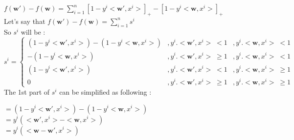 \documentclass[a4paper,11pt]{article}
\begin{document}
\begin{mlsolution}
\begin{math}
f\left ( \textbf{w}{}' \right ) - f\left ( \textbf{w} \right ) = \sum_{i=1}^{n} \left [  1 - y^{i}<\textbf{w}{}', x^{i}> \right ]_{+} - \left [  1 - y^{i}<\textbf{w}, x^{i}> \right ]_{+}
\end{math}\\

Let's say that 
\begin{math}
f\left ( \textbf{w}{}' \right ) - f\left ( \textbf{w} \right ) = \sum_{i=1}^{n} s^{i}
\end{math}\\

So \begin{math}s^{i}\end{math} will be :\\

\begin{math}
s^{i} = \left\{\begin{matrix}
\left ( 1 - y^{i}<\textbf{w}{}', x^{i}>  \right ) - \left ( 1 - y^{i}<\textbf{w}, x^{i}> \right ) & ,y^{i}.<\textbf{w}{}', x^{i}> \; <  1&,  y^{i}.<\textbf{w}, x^{i}> \;< 1\\ 
- \left ( 1 - y^{i}<\textbf{w}, x^{i}> \right ) & ,y^{i}.<\textbf{w}{}', x^{i}> \; \geq  1 & ,  y^{i}.<\textbf{w}, x^{i}> \;< 1\\ 
\left ( 1 - y^{i}<\textbf{w}{}', x^{i}>  \right ) & ,y^{i}.<\textbf{w}{}', x^{i}> \; <  1 & ,  y^{i}.<\textbf{w}, x^{i}> \; \geq 1\\ 
0 & ,y^{i}.<\textbf{w}{}', x^{i}> \; \geq  1 & ,  y^{i}.<\textbf{w}, x^{i}> \; \geq 1
\end{matrix}\right.
\end{math}\\

The 1st part of \begin{math}s^{i}\end{math} can be simplified as following :

\begin{math}
=\left ( 1 - y^{i}<\textbf{w}{}', x^{i}>  \right ) - \left ( 1 - y^{i}<\textbf{w}, x^{i}> \right )\end{math}\\

\begin{math}= y^{i} \left (  <\textbf{w}{}', x^{i}> - <\textbf{w}, x^{i}>\right )\end{math}\\

\begin{math}= y^{i} \left (<\textbf{w} -\textbf{w}{}', x^{i}>\right )\end{math}\\


\end{mlsolution}
\end{document}
